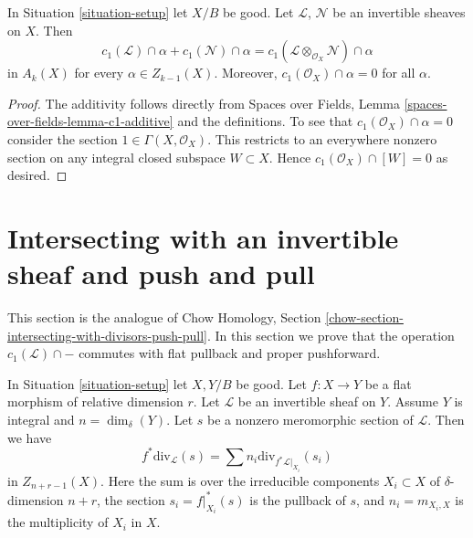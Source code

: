 \begin{lemma}
\label{lemma-c1-cap-additive}
In Situation \ref{situation-setup} let $X/B$ be good.
Let $\mathcal{L}$, $\mathcal{N}$ be an invertible sheaves on $X$.
Then
$$
c_1(\mathcal{L}) \cap \alpha  + c_1(\mathcal{N}) \cap \alpha =
c_1(\mathcal{L} \otimes_{\mathcal{O}_X} \mathcal{N}) \cap \alpha
$$
in $A_k(X)$ for every $\alpha \in Z_{k - 1}(X)$. Moreover,
$c_1(\mathcal{O}_X) \cap \alpha = 0$ for all $\alpha$.
\end{lemma}

\begin{proof}
The additivity follows directly from
Spaces over Fields, Lemma \ref{spaces-over-fields-lemma-c1-additive}
and the definitions. To see that $c_1(\mathcal{O}_X) \cap \alpha = 0$
consider the section $1 \in \Gamma(X, \mathcal{O}_X)$. This restricts
to an everywhere nonzero section on any integral closed subspace
$W \subset X$. Hence $c_1(\mathcal{O}_X) \cap [W] = 0$ as desired.
\end{proof}










\section{Intersecting with an invertible sheaf and push and pull}
\label{section-intersecting-with-divisors-push-pull}

\noindent
This section is the analogue of
Chow Homology, Section \ref{chow-section-intersecting-with-divisors-push-pull}.
In this section we prove that the operation $c_1(\mathcal{L}) \cap -$
commutes with flat pullback and proper pushforward.

\begin{lemma}
\label{lemma-prepare-flat-pullback-cap-c1}
In Situation \ref{situation-setup} let $X, Y/B$ be good.
Let $f : X \to Y$ be a flat morphism of relative dimension $r$.
Let $\mathcal{L}$ be an invertible sheaf on $Y$.
Assume $Y$ is integral and $n = \dim_\delta(Y)$.
Let $s$ be a nonzero meromorphic section of $\mathcal{L}$.
Then we have
$$
f^*\text{div}_\mathcal{L}(s) = \sum n_i\text{div}_{f^*\mathcal{L}|_{X_i}}(s_i)
$$
in $Z_{n + r - 1}(X)$. Here the sum is over the irreducible
components $X_i \subset X$ of $\delta$-dimension $n + r$,
the section $s_i = f|_{X_i}^*(s)$ is the pullback of $s$, and
$n_i = m_{X_i, X}$ is the multiplicity of $X_i$ in $X$.
\end{lemma}

